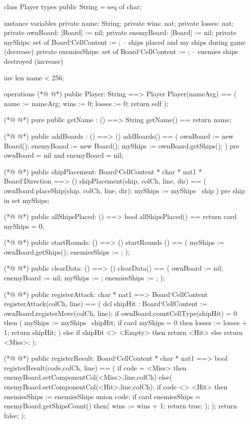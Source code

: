 \begin{vdmpp}[breaklines=true]
class Player
types
 public String = seq of char;

instance variables
 private name: String;
 private wins: nat;
 private losses: nat;
 private ownBoard: [Board] := nil;
 private enemyBoard: [Board] := nil;
 private myShips: set of Board`CellContent := {}; -- ships placed and my ships during game (decrease)
 private enemiesShips: set of Board`CellContent := {}; -- enemies ships destroyed (increase)
 
 inv len name < 256;
 
operations
(*@
\label{Player:17}
@*)
 public Player: String ==> Player
  Player(nameArg) == (
   name := nameArg;
   wins := 0;
   losses := 0;
   return self
  );
   
(*@
\label{getName:25}
@*)
 pure public getName : () ==> String
  getName() == return name;
   
(*@
\label{addBoards:28}
@*)
 public addBoards : () ==> ()
  addBoards() == (
   ownBoard := new Board();
   enemyBoard := new Board();
   myShips := ownBoard.getShips();
  )
  pre ownBoard = nil and enemyBoard = nil;
  
(*@
\label{shipPlacement:36}
@*)
 public shipPlacement: Board`CellContent * char * nat1 * Board`Direction ==> ()
  shipPlacement(ship, colCh, line, dir) == (
   ownBoard.placeShip(ship, colCh, line, dir);
   myShips := myShips \ {ship}
  )
  pre ship in set myShips;
 
(*@
\label{allShipsPlaced:43}
@*)
 public allShipsPlaced: () ==> bool
  allShipsPlaced() == return card myShips = 0;
 
(*@
\label{startRounds:46}
@*)
 public startRounds: () ==> ()
  startRounds () == (
   myShips := ownBoard.getShips();
   enemiesShips := {};
  );
 
(*@
\label{clearData:52}
@*)
 public clearData: () ==> ()
  clearData() == (
   ownBoard := nil;
   enemyBoard := nil;
   myShips := {};
   enemiesShips := {};
  );
 
(*@
\label{registerAttack:60}
@*)
 public registerAttack: char * nat1 ==> Board`CellContent
  registerAttack(colCh, line) == (
   dcl shipHit : Board`CellContent := ownBoard.registerMove(colCh, line);
   if ownBoard.countCellType(shipHit) = 0 then (
    myShips := myShips \ {shipHit};
    if card myShips = 0 then losses := losses + 1;
    return shipHit;
   )
   else if shipHit <> <Empty> then return <Hit>
   else return <Miss>;
  );
 
(*@
\label{registerResult:72}
@*)
 public registerResult: Board`CellContent * char * nat1 ==> bool
  registerResult(code,colCh, line) == (
  if code = <Miss> then enemyBoard.setComponentCol(<Miss>,line,colCh)
  else(
   enemyBoard.setComponentCol(<Hit>,line,colCh);
    if code <> <Hit> then enemiesShips := enemiesShips union {code};
    if card enemiesShips = enemyBoard.getShipsCount() then(
     wins := wins + 1;
     return true;
    );
   );
   return false;
 );
 

\end{vdmpp}
